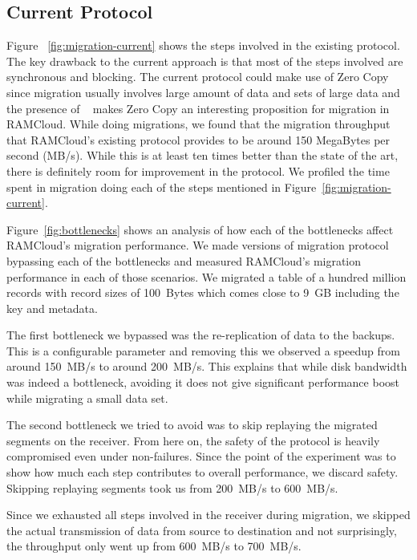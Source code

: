 \subsection{Current Protocol}
Figure ~\ref{fig:migration-current} shows the steps involved in the existing protocol. The key drawback to the current approach is that 
most of the steps involved are synchronous and blocking. The current protocol could make use of Zero Copy since migration usually involves 
large amount of data and sets of large data and the presence of ~\cite{ramcloudtx} makes Zero Copy an interesting proposition 
for migration in RAMCloud. While doing migrations, we found that the migration throughput that RAMCloud's existing protocol provides to 
be around 150 MegaBytes per second (MB/s). While this is at least ten times better than the state of the art, there is definitely room for improvement in the protocol.
We profiled the time spent in migration doing each of the steps mentioned in Figure~\ref{fig:migration-current}.



Figure~\ref{fig:bottlenecks} shows an analysis of how each of the bottlenecks affect RAMCloud's migration performance. We made versions of migration 
protocol bypassing each of the bottlenecks and measured RAMCloud's migration performance in each of those scenarios. We migrated a table of a hundred million 
records with record sizes of 100~Bytes which comes close to 9~GB including the key and metadata.

The first bottleneck we bypassed was the re-replication of data to the backups. This is a configurable parameter and removing this we observed a speedup from around 150~MB/s to around 
200~MB/s. This explains that while disk bandwidth was indeed a bottleneck, avoiding it does not give significant performance boost while migrating a small data set.

The second bottleneck we tried to avoid was to skip replaying the migrated segments on the receiver. From here on, the safety of the protocol is heavily compromised even under 
 non-failures. Since the point of the experiment was to show how much each step contributes to overall performance, we discard safety. Skipping replaying segments took us from 
 200~MB/s to 600~MB/s. 

Since we exhausted all steps involved in the receiver during migration, we skipped the actual transmission of data from source to destination and not surprisingly, the throughput 
only went up from 600~MB/s to 700~MB/s. 

